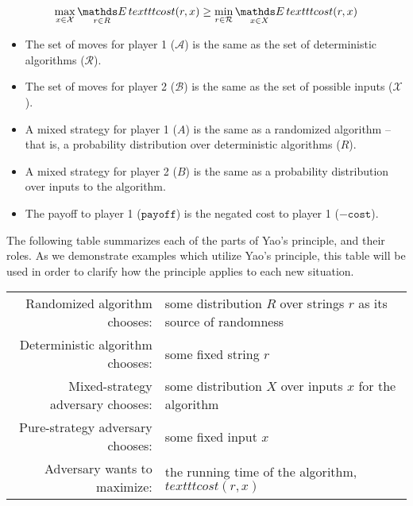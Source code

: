 $$\max_{x \in \mathcal{X}} \Expected_{r \in R} texttt{cost}(r, x) \geq \min_{r \in \mathcal{R}} \Expected_{x \in X} texttt{cost}(r, x)$$

\begin{itemize}

\item{The set of moves for player 1 ($\mathcal{A}$) is the same as the set of deterministic algorithms ($\mathcal{R}$).}
\item{The set of moves for player 2 ($\mathcal{B}$) is the same as the set of possible inputs ($\mathcal{X}$).}
\item{A mixed strategy for player 1 ($A$) is the same as a randomized algorithm -- that is, a probability distribution over deterministic algorithms ($R$).}
\item{A mixed strategy for player 2 ($B$) is the same as a probability distribution over inputs to the algorithm.}
\item{The payoff to player 1 ($\texttt{payoff}$) is the negated cost to player 1 ($-\texttt{cost}$).}

\end{itemize}


The following table summarizes each of the parts of Yao's principle, and their roles. As we demonstrate examples which utilize Yao's principle, this table will be used in order to clarify how the principle applies to each new situation.

\begin{tabular}{r l} %
Randomized algorithm chooses: & some distribution $R$ over strings $r$ as its source of randomness
\\
Deterministic algorithm chooses: & some fixed string $r$
\\
Mixed-strategy adversary chooses: & some distribution $X$ over inputs $x$ for the algorithm
\\
Pure-strategy adversary chooses: & some fixed input $x$
\\
Adversary wants to maximize: & the running time of the algorithm, $texttt{cost}(r,x)$
\end{tabular}
